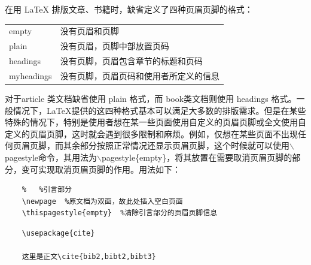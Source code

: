 \documentclass[12pt]{book}
\begin{document}
在用 \LaTeX{} 排版文章、书籍时，缺省定义了四种页眉页脚的格式：

\begin{table}[h]
    \centering
    \begin{tabular}{ll}
        empty      & 没有页眉和页脚              \\
        plain      & 没有页眉，页脚中部放置页码        \\
        headings   & 没有页脚，页眉包含章节的标题和页码    \\
        myheadings & 没有页脚，页眉页码和使用者所定义的信息 
    \end{tabular}
\end{table}

对于article 类文档缺省使用 plain 格式，而 book类文档则使用 headings 格式。一般情况下，\LaTeX{}提供的这四种格式基本可以满足大多数的排版需求。但是在某些特殊的情况下，特别是使用者想在某一些页面使用自定义的页眉页脚或全文使用自定义的页眉页脚，这时就会遇到很多限制和麻烦。例如，仅想在某些页面不出现任何页眉页脚，而其余部分按照正常情况还显示页眉页脚，这个时候就可以使用$\backslash$pagestyle命令，其用法为$\backslash$pagestyle\{empty\}，将其放置在需要取消页眉页脚的部分，变可实现取消页眉页脚的作用。用法如下：
\begin{verbatim}
    %   %引言部分
    \newpage  %原文档为双面，故此处插入空白页面
    \thispagestyle{empty}  %清除引言部分的页眉页脚信息
\end{verbatim}
\begin{verbatim}
    \usepackage{cite}
    
    这里是正文\cite{bib2,bibt2,bibt3}
\end{verbatim}
\end{document}
